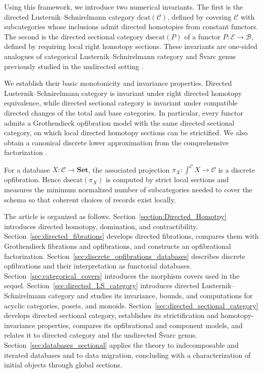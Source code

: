 \documentclass[12pt]{amsart}
\theoremstyle{definition}
\theoremstyle{remark}
\numberwithin{figure}{section}%
\newcommand{\Ba}{\mathcal{B}}
\newcommand{\CC}{\mathcal{C}}
\newcommand{\E}{\mathcal{E}}
\newcommand{\Sets}{\mathbf{Set}}
\begin{document}
Using this framework, we introduce two numerical invariants. The first is
the directed Lusternik--Schnirelmann category
\(\mathrm{dcat}(\CC)\), defined by covering \(\CC\) with subcategories
whose inclusions admit directed homotopies from constant functors. The
second is the directed sectional category \(\mathrm{dsecat}(P)\) of a
functor \(P\colon\E\to\Ba\), defined by requiring local right homotopy
sections. These invariants are one-sided analogues of categorical
Lusternik--Schnirelmann category and \v{S}varc genus previously studied in
the undirected setting
\cite{LS-Tanaka,Homotopic_Distance,Baues-Isaac,carcaciacampos2026weakstrongfibrationsfunctors}.

We establish their basic monotonicity and invariance properties. Directed
Lusternik--Schnirelmann category is invariant under right directed
homotopy equivalence, while directed sectional category is invariant under
compatible directed changes of the total and base categories. In
particular, every functor admits a Grothendieck opfibration model with the
same directed sectional category, on which local directed homotopy
sections can be strictified. We also obtain a canonical discrete lower
approximation from the comprehensive factorization \cite{StreetWalters}.

For a database \(X\colon\CC\to\Sets\), the associated projection
\(\pi_X\colon\int^\CC X\to\CC\) is a discrete opfibration. Hence
\(\mathrm{dsecat}(\pi_X)\) is computed by strict local sections and
measures the minimum normalized number of subcategories needed to cover
the schema so that coherent choices of records exist locally.


The article is organized as follows. Section~\ref{section:Directed_Homotpy} introduces directed
homotopy, domination, and contractibility. Section~\ref{sec:directed_fibrations} develops directed
fibrations, compares them with Grothendieck fibrations and opfibrations, and
constructs an opfibrational factorization. Section~\ref{sec:discrete_opfibrations_databases} describes discrete
opfibrations and their interpretation as functorial databases. Section~\ref{sec:categorical_covers}
introduces the morphism covers used in the sequel. Section~\ref{sec:directed_LS_category} introduces directed Lusternik--Schnirelmann category and studies
its invariance, bounds, and computations for acyclic categories, posets,
and monoids.  Section~\ref{sec:directed_sectional_category} develops directed sectional category, establishes its strictification and homotopy-invariance properties, compares its opfibrational and component models, and relates it to directed category and the undirected \v{S}varc genus. Section~\ref{sec:databases_sectional} applies the theory to indecomposable and iterated databases and to data migration, concluding with a characterization of initial objects through global sections.
\end{document}
